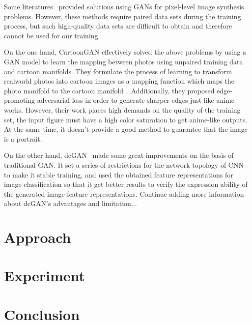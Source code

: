 \documentclass[10pt,twocolumn,letterpaper]{article}
\begin{document}
Some literatures~\cite{dumoulin2016adversarially,isola2017image,karacan2016learning} provided solutions using GANs for pixel-level image 
synthesis problems. However, these methods require paired data sets 
during the training process, but such high-quality data sets are 
difficult to obtain and therefore cannot be used for our training.

On the one hand, CartoonGAN effectively solved the above problems by using a GAN model 
to learn the mapping between photos using unpaired training data and 
cartoon manifolds. They formulate the process of learning to transform realworld 
photos into cartoon images as a mapping function which maps the photo 
manifold to the cartoon manifold~\cite{CartoonGAN}. Additionally, they proposed
edge-promoting adversarial loss in order to generate sharper edges just like anime works.
However, their work places high demands on the quality of the training set, the input
figure must have a high color saturation to get anime-like outputs. At the same time, 
it doesn't provide a good method to guarantee that the image is a portrait.

On the other hand, dcGAN~\cite{dcGAN} made some great improvements on the basis of traditional GAN.
It set a series of restrictions for the network topology of CNN to make it stable training, and 
used the obtained feature representations for image classification so that it get better results 
to verify the expression ability of the generated image feature representations.
{\color{red}Continue adding more information about dcGAN's advantages and limitation...}


\section{Approach}



\section{Experiment}

\section{Conclusion}

{\small


}
\end{document}
